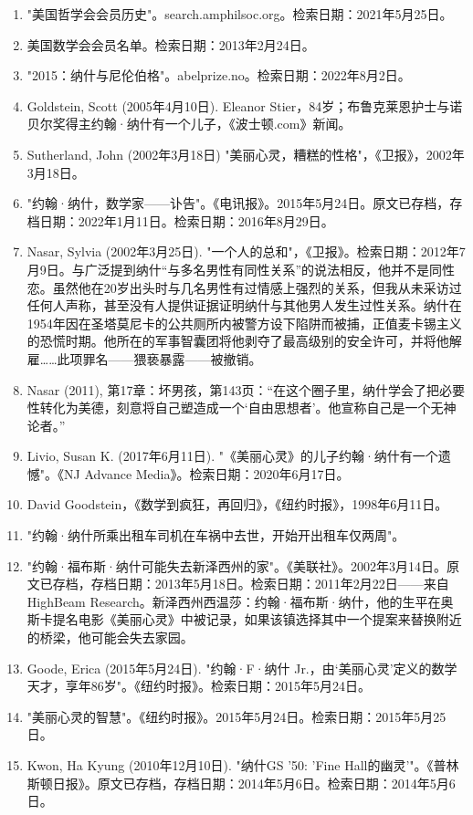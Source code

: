 \begin{enumerate}
\item "美国哲学会会员历史"。search.amphilsoc.org。检索日期：2021年5月25日。
\item 美国数学会会员名单。检索日期：2013年2月24日。
\item "2015：纳什与尼伦伯格"。abelprize.no。检索日期：2022年8月2日。
\item Goldstein, Scott (2005年4月10日). Eleanor Stier，84岁；布鲁克莱恩护士与诺贝尔奖得主约翰·纳什有一个儿子，《波士顿.com》新闻。
\item Sutherland, John (2002年3月18日) "美丽心灵，糟糕的性格"，《卫报》，2002年3月18日。
\item "约翰·纳什，数学家——讣告"。《电讯报》。2015年5月24日。原文已存档，存档日期：2022年1月11日。检索日期：2016年8月29日。
\item Nasar, Sylvia (2002年3月25日). "一个人的总和"，《卫报》。检索日期：2012年7月9日。与广泛提到纳什“与多名男性有同性关系”的说法相反，他并不是同性恋。虽然他在20岁出头时与几名男性有过情感上强烈的关系，但我从未采访过任何人声称，甚至没有人提供证据证明纳什与其他男人发生过性关系。纳什在1954年因在圣塔莫尼卡的公共厕所内被警方设下陷阱而被捕，正值麦卡锡主义的恐慌时期。他所在的军事智囊团将他剥夺了最高级别的安全许可，并将他解雇……此项罪名——猥亵暴露——被撤销。
\item Nasar (2011), 第17章：坏男孩，第143页：“在这个圈子里，纳什学会了把必要性转化为美德，刻意将自己塑造成一个‘自由思想者’。他宣称自己是一个无神论者。”
\item Livio, Susan K. (2017年6月11日). "《美丽心灵》的儿子约翰·纳什有一个遗憾"。《NJ Advance Media》。检索日期：2020年6月17日。
\item David Goodstein，《数学到疯狂，再回归》，《纽约时报》，1998年6月11日。
\item "约翰·纳什所乘出租车司机在车祸中去世，开始开出租车仅两周"。
\item "约翰·福布斯·纳什可能失去新泽西州的家"。《美联社》。2002年3月14日。原文已存档，存档日期：2013年5月18日。检索日期：2011年2月22日——来自HighBeam Research。新泽西州西温莎：约翰·福布斯·纳什，他的生平在奥斯卡提名电影《美丽心灵》中被记录，如果该镇选择其中一个提案来替换附近的桥梁，他可能会失去家园。
\item Goode, Erica (2015年5月24日). "约翰·F·纳什 Jr.，由‘美丽心灵’定义的数学天才，享年86岁"。《纽约时报》。检索日期：2015年5月24日。
\item "美丽心灵的智慧"。《纽约时报》。2015年5月24日。检索日期：2015年5月25日。
\item Kwon, Ha Kyung (2010年12月10日). "纳什GS '50: 'Fine Hall的幽灵'"。《普林斯顿日报》。原文已存档，存档日期：2014年5月6日。检索日期：2014年5月6日。

\end{enumerate}
